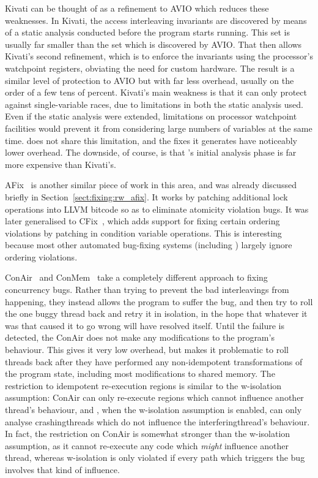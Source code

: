 Kivati\cite{Chew2010} can be thought of as a refinement to AVIO which
reduces these weaknesses.  In Kivati, the access interleaving
invariants are discovered by means of a static analysis conducted
before the program starts running.  This set is usually far smaller
than the set which is discovered by AVIO.  That then allows Kivati's
second refinement, which is to enforce the invariants using the
processor's watchpoint registers\cite[Chapter 16.2: Debug
  Registers]{Intel2009}, obviating the need for custom hardware.  The
result is a similar level of protection to AVIO but with far less
overhead, usually on the order of a few tens of percent.  Kivati's
main weakness is that it can only protect against single-variable
races, due to limitations in both the static analysis used.  Even if
the static analysis were extended, limitations on processor watchpoint
facilities would prevent it from considering large numbers of
variables at the same time.  {\Technique} does not share this
limitation, and the fixes it generates have noticeably lower overhead.
The downside, of course, is that {\technique}'s initial analysis phase
is far more expensive than Kivati's.

AFix~\cite{Jin2011} is another similar piece of work in this area, and
was already discussed briefly in Section~\ref{sect:fixing:rw_afix}.
It works by patching additional lock operations into LLVM bitcode so
as to eliminate atomicity violation bugs.  It was later generalised to
CFix~\cite{Jin2012}, which adds support for fixing certain ordering
violations by patching in condition variable operations.  This is
interesting because most other automated bug-fixing systems (including
{\technique}) largely ignore ordering violations.  

ConAir~\cite{Zhang2013} and ConMem~\cite{Zhang2010} take a completely
different approach to fixing concurrency bugs.  Rather than trying to
prevent the bad interleavings from happening, they instead allows the
program to suffer the bug, and then try to roll the one buggy thread
back and retry it in isolation, in the hope that whatever it was that
caused it to go wrong will have resolved itself.  Until the failure is
detected, the ConAir does not make any modifications to the program's
behaviour.  This gives it very low overhead, but makes it problematic
to roll threads back after they have performed any non-idempotent
transformations of the program state, including most modifications to
shared memory.  The restriction to idempotent re-execution regions is
similar to the \gls{w-isolation} assumption: ConAir can only
re-execute regions which cannot influence another thread's behaviour,
and {\technique}, when the \gls{w-isolation} assumption is enabled,
can only analyse \glspl{crashingthread} which do not influence the
\gls{interferingthread}'s behaviour.  In fact, the restriction on
ConAir is somewhat stronger than the \gls{w-isolation} assumption, as
it cannot re-execute any code which \emph{might} influence another
thread, whereas \gls{w-isolation} is only violated if every path which
triggers the bug involves that kind of influence.

